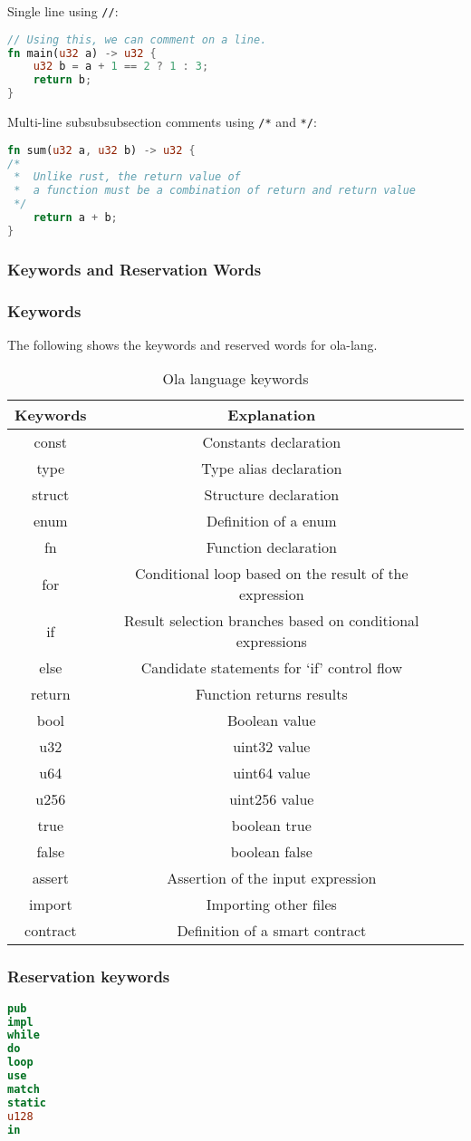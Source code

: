 Single line using \texttt{//}:
\begin{lstlisting}[language=rust]
// Using this, we can comment on a line.
fn main(u32 a) -> u32 {
    u32 b = a + 1 == 2 ? 1 : 3;
    return b;
}
\end{lstlisting}

Multi-line subsubsubsection comments using \texttt{/*} and \texttt{*/}:
\begin{lstlisting}[language=rust]
fn sum(u32 a, u32 b) -> u32 {
/* 
 *  Unlike rust, the return value of 
 *  a function must be a combination of return and return value
 */
    return a + b;
}
\end{lstlisting}



\subsubsection{Keywords and Reservation Words}

\subsubsection*{Keywords} 

The following  shows the keywords and reserved words for ola-lang.

\begin{table}[!ht]
\centering
\begin{tabular}{c|c|c}
\textbf{Keywords} & \textbf{Explanation} \\ \hline
const & Constants declaration \\
type & Type alias declaration \\
struct & Structure declaration \\
enum & Definition of a enum \\
fn & Function declaration \\
for & Conditional loop based on the result of the expression \\
if & Result selection branches based on conditional expressions \\
else & Candidate statements for `if' control flow \\
return & Function returns results \\
bool & Boolean value \\
u32 & uint32 value \\
u64 & uint64 value \\
u256 & uint256 value \\
true & boolean true \\
false & boolean false \\
assert & Assertion of the input expression \\
import & Importing other files \\
contract & Definition of a smart contract \\
\end{tabular}
\caption{Ola language keywords}
\label{table: ola-lang-keywords}
\end{table}

\subsubsection*{Reservation keywords}

\begin{lstlisting}[language=Rust]
pub
impl
while
do
loop
use
match
static
u128
in
\end{lstlisting}
    